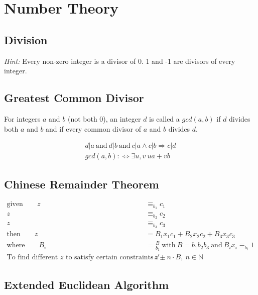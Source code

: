 \documentclass[11pt]{article}
\begin{document}
\section{Number Theory}

\subsection{Division}

\emph{Hint:} Every non-zero integer is a divisor of 0. 1 and -1 are divisors of every integer.

\subsection{Greatest Common Divisor}

For integers $a$ and $b$ (not both 0), an integer $d$ is called a $gcd(a,b)$ if $d$ divides both $a$ and $b$ and if every common divisor of $a$ and $b$ divides $d$.

\begin{equation*}
\begin{split}
	d|a\ \text{and}\ d|b\ \text{and}\ c|a \land c|b \Rightarrow c|d \\
	gcd(a,b) :\Leftrightarrow \exists u,v\ ua + vb
\end{split}
\end{equation*}

\subsection{Chinese Remainder Theorem}

\begin{equation*}
\begin{split}
	\text{given}\qquad z & \equiv_{b_1} c_1 \\
	z & \equiv_{b_2} c_2 \\
	z & \equiv_{b_3} c_3 \\
	\text{then}\qquad z & = B_1x_1c_1 + B_2x_2c_2 + B_3x_3c_3 \\
	\text{where}\qquad B_i & = \frac{B}{b_1}\ \text{with}\ B = b_1b_2b_3\ \text{and}\ B_ix_i \equiv_{b_i} 1 \\
	\text{To find different $z$ to satisfy certain constraints}\qquad z' & = z \pm n \cdot B,\ n \in \mathbb{N}
\end{split}
\end{equation*}

\subsection{Extended Euclidean Algorithm}
\end{document}
